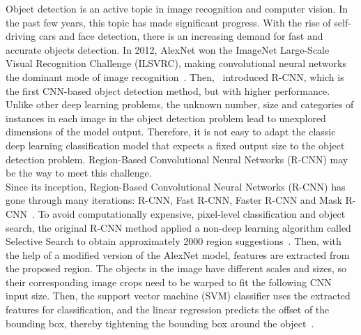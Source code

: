 Object detection is an active topic in image recognition and computer vision. In the past few years, this topic has made significant progress. With the rise of self-driving cars and face detection, there is an increasing demand for fast and accurate objects detection. In 2012, AlexNet won the ImageNet Large-Scale Visual Recognition Challenge (ILSVRC), making convolutional neural networks the dominant mode of image recognition~\cite{krizhevsky2012imagenet}. Then,~ introduced R-CNN, which is the first CNN-based object detection method, but with higher performance.\\

Unlike other deep learning problems, the unknown number, size and categories of instances in each image in the object detection problem lead to unexplored dimensions of the model output. Therefore, it is not easy to adapt the classic deep learning classification model that expects a fixed output size to the object detection problem. Region-Based Convolutional Neural Networks (R-CNN) may be the way to meet this challenge.\\

Since its inception, Region-Based Convolutional Neural Networks (R-CNN) has gone through many iterations: R-CNN, Fast R-CNN, Faster R-CNN and Mask R-CNN~\cite{girshick2014rich, girshick2015fast, ren2015faster, he2017mask}. To avoid computationally expensive, pixel-level classification and object search, the original R-CNN method applied a non-deep learning algorithm called Selective Search to obtain approximately 2000 region suggestions~\cite{uijlings2013selective, girshick2014rich}. Then, with the help of a modified version of the AlexNet model, features are extracted from the proposed region. The objects in the image have different scales and sizes, so their corresponding image crops need to be warped to fit the following CNN input size. Then, the support vector machine (SVM) classifier uses the extracted features for classification, and the linear regression predicts the offset of the bounding box, thereby tightening the bounding box around the object~\cite{girshick2014rich}.\\

